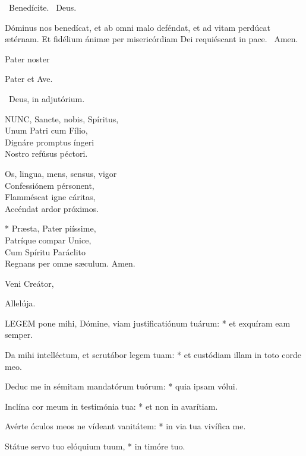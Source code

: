 \V\ Benedícite. \R\ Deus.

 Dóminus nos benedícat, et ab omni malo deféndat, et ad vitam perdúcat ætérnam. Et fidélium ánimæ per misericórdiam Dei requiéscant in pace. \R\ Amen.

 Pater noster 


Pater et Ave.

\V\ Deus, in adjutórium.


\lettrine[lines=2]{N}{UNC}, Sancte, nobis, Spíritus,\\
Unum Patri cum Fílio,\\
Dignáre promptus íngeri\\
Nostro refúsus péctori.

Os, lingua, mens, sensus, vigor\\
Confessiónem pérsonent,\\
Flamméscat igne cáritas,\\
Accéndat ardor próximos.

* Præsta, Pater piíssime,\\
Patríque compar Unice,\\
Cum Spíritu Paráclito\\
Regnans per omne sæculum. Amen.

 Veni Creátor, 



 Allelúja.


\lettrine[lines=2]{L}{EGEM} pone mihi, Dómine, viam justificatiónum tuárum: * et exquíram eam semper.

Da mihi intelléctum, et scrutábor legem tuam: * et custódiam illam in toto corde meo.

Deduc me in sémitam mandatórum tuórum: * quia ipsam vólui.

Inclína cor meum in testimónia tua: * et non in avarítiam.

Avérte óculos meos ne vídeant vanitátem: * in via tua vivífica me.

Státue servo tuo elóquium tuum, * in timóre tuo.

